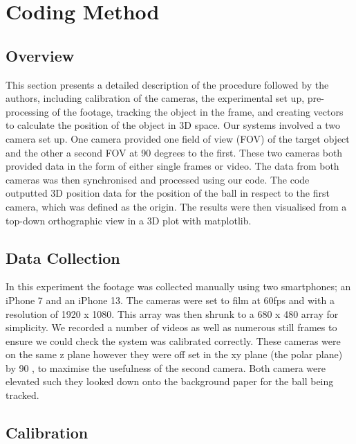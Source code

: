 \documentclass{article}
\begin{document}
\section{Coding Method}

\subsection{Overview}

This section presents a detailed description of the procedure followed by the authors, including calibration of the cameras, the experimental set up, pre-processing of the footage, tracking the object in the frame, and creating vectors to calculate the position of the object in 3D space. Our systems involved a two camera set up. One camera provided one field of view (FOV) of the target object and the other a second FOV at 90 degrees to the first. These two cameras both provided data in the form of either single frames or video. The data from both cameras was then synchronised and processed using our code. The code outputted 3D position data for the position of the ball in respect to the first camera, which was defined as the origin. The results were then visualised from a top-down orthographic view in a 3D plot with matplotlib.

\subsection{Data Collection}

In this experiment the footage was collected manually using two smartphones; an iPhone 7 and an iPhone 13. The cameras were set to film at 60fps and with a resolution of 1920 x 1080. This array was then shrunk to a 680 x 480 array for simplicity. We recorded a number of videos as well as numerous still frames to ensure we could check the system was calibrated correctly. These cameras were on the same z plane however they were off set in the xy plane (the polar plane) by 90 , to maximise the usefulness of the second camera. Both camera were elevated such they looked down onto the background paper for the ball being tracked. 
 

\subsection{Calibration}
\end{document}
